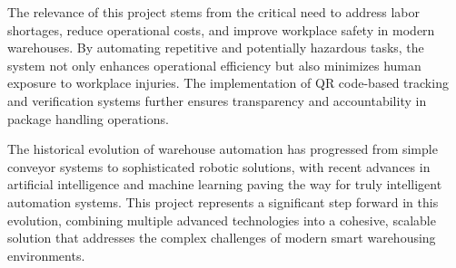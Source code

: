 The relevance of this project stems from the critical need to address labor shortages, reduce operational costs, and improve workplace safety in modern warehouses. By automating repetitive and potentially hazardous tasks, the system not only enhances operational efficiency but also minimizes human exposure to workplace injuries. The implementation of QR code-based tracking and verification systems further ensures transparency and accountability in package handling operations.

The historical evolution of warehouse automation has progressed from simple conveyor systems to sophisticated robotic solutions, with recent advances in artificial intelligence and machine learning paving the way for truly intelligent automation systems. This project represents a significant step forward in this evolution, combining multiple advanced technologies into a cohesive, scalable solution that addresses the complex challenges of modern smart warehousing environments.